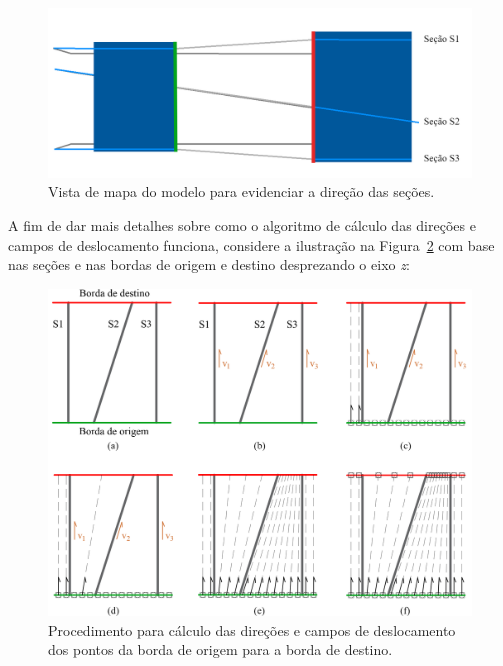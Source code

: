 \begin{figure} [H]
  \begin{center}
    \includegraphics[width=350pt]{images/fig-select-borders-3}
    \caption{Vista de mapa do modelo para evidenciar a direção das seções.}\label{fig-select-borders-3}
  \end{center}
\end{figure}

A fim de dar mais detalhes sobre como o algoritmo de cálculo das direções e campos de deslocamento funciona, considere a ilustração na Figura~\ref{fig-select-borders-4} com base nas seções e nas bordas de origem e destino desprezando o eixo \textit{z}:

\begin{figure} [H]
  \begin{center}
    \includegraphics[width=370pt]{images/fig-select-borders-4}
    \caption{Procedimento para cálculo das direções e campos de deslocamento dos pontos da borda de origem para a borda de destino.}\label{fig-select-borders-4}
  \end{center}
\end{figure}

